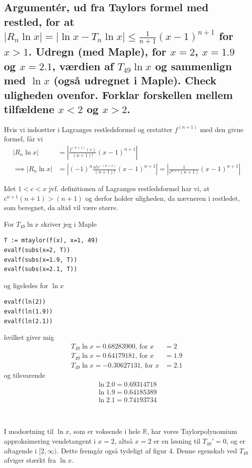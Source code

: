 \documentclass[11pt,a4paper]{article}
\newcommand{\modulus}[1]{\left|#1\right|}
\begin{document}
\subsection
{
    \mdseries
    Argumentér, ud fra Taylors formel med restled, for at $\modulus{R_n
    \ln x} = \modulus{\ln x - T_n \ln x} \leq \frac{1}{n+1}(x-1)^{n+1}$ for
    $x > 1$. Udregn (med Maple), for $x = 2$, $x = 1.9$ og $x = 2.1$, værdien
    af $T_{49} \ln x$ og sammenlign med $\ln x$ (også udregnet i Maple).
    Check uligheden ovenfor. Forklar forskellen mellem tilfældene $x < 2$ og
    $x > 2$.
}
Hvis vi indsætter i Lagranges restledsformel og erstatter $f^{(n+1)}$ med den
givne formel, får vi
\begin{align}
    \modulus{R_n \ln x} &= \modulus{ \frac{f^{(n+1)} (c)}{(n + 1)!} (x - 1)^{n+1} }
    \\\implies
    \modulus{R_n \ln x}
    &= \modulus{ (-1)^n \frac{n! c^{-(n + 1)}}{(n + 1)!} (x - 1)^{n+1} }
    = \modulus{ \frac{1}{c^{n + 1}(n + 1)} (x - 1)^{n+1} }
\end{align}

Idet $1 < c < x$ jvf. definitionen af Lagranges restledsformel har vi, at
$c^{n+1} (n + 1) > (n + 1)$ og derfor holder uligheden, da nævneren i
restledet, som beregnet, da altid vil være større.

\begin{multicols}{2}
    For $T_{49} \ln x$ skriver jeg i Maple
    \begin{lstlisting}
T := mtaylor(f(x), x=1, 49)
evalf(subs(x=2, T))
evalf(subs(x=1.9, T))
evalf(subs(x=2.1, T))
    \end{lstlisting}
    og ligeledes for $\ln x$
    \begin{lstlisting}
evalf(ln(2))
evalf(ln(1.9))
evalf(ln(2.1))
    \end{lstlisting}
    
    hvilket giver mig
    \begin{align}
        T_{49} \ln x =  0.68283900 \text{, for } x &= 2 \\
        T_{49} \ln x =  0.64179181 \text{, for } x &= 1.9 \\
        T_{49} \ln x = -0.30627131 \text{, for } x &= 2.1
    \end{align}
    og tilsvarende
    \begin{align}
        \ln 2.0 = 0.69314718 \\
        \ln 1.9 = 0.64185389 \\
        \ln 2.1 = 0.74193734
    \end{align}
    
    \vfill{\ }\columnbreak

    I modsætning til $\ln x$, som er voksende i hele $\mathbb{R}$, har vores
    Taylorpolynomium approksimering vendetangent i $x = 2$, altså $x = 2$ er
    en løsning til $T_{49}' = 0$, og er aftagende i $[2,\infty)$. Dette
    fremgår også tydeligt af figur 4. Denne egenskab ved $T_{49}$ afviger
    stærkt fra $\ln x$.

\end{multicols}
\end{document}
